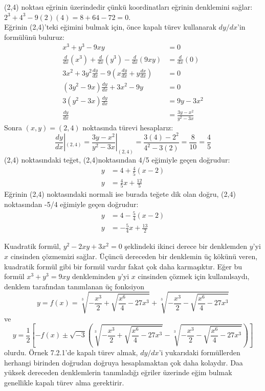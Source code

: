 \begin{cozum} (2,4) noktası eğrinin üzerindedir çünkü koordinatları eğrinin denklemini sağlar:\\
$2^3+4^3-9(2)(4)=8+64-72=0$.\\
Eğrinin (2,4)'teki eğimini bulmak için, önce kapalı türev kullanarak $dy/dx$'in formülünü buluruz:
	\begin{equation*}
	\begin{split}
	x^3+y^3-9xy&=0\\
	\frac{d}{dx}(x^3)+\frac{d}{dx}(y^3)-\frac{d}{dx}(9xy)&=\frac{d}{dx}(0)\\
	3x^2+3y^2\frac{dy}{dx}-9\left(x \frac{dy}{dx}+y \frac{dx}{dx}\right)&=0\\
	(3y^2-9x)\frac{dy}{dx}+3x^2-9y&=0\\
	3(y^2-3x)\frac{dy}{dx}&=9y-3x^2\\
	\frac{dy}{dx}&=\frac{3y-x^2}{y^2-3x}
	\end{split}
	\end{equation*}
Sonra $(x,y)=(2,4)$ noktasında türevi hesaplarız:
	\begin{equation*}
	\frac{dy}{dx}|_{(2,4)}=\frac{3y-x^2}{y^2-3x}|_{(2,4)}=\frac{3(4)-2^2}{4^2-3(2)}=\frac{8}{10}=\frac{4}{5}
	\end{equation*}
(2,4) noktasındaki teğet, (2,4)noktasından 4/5 eğimiyle geçen doğrudur:
	\begin{equation*}
	\begin{split}
	y&=4+\frac{4}{5}(x-2)\\
	y&=\frac{4}{5}x+\frac{12}{5}
	\end{split}
	\end{equation*}
Eğrinin (2,4) noktasındaki normali ise burada teğete dik olan doğru, (2,4) noktasından -5/4 eğimiyle geçen doğrudur:
	\begin{equation*}
	\begin{split}
	y&=4-\frac{5}{4}(x-2)\\
	y&=-\frac{5}{4}x+\frac{13}{2}
	\end{split}
	\end{equation*}
\end{cozum}
Kuadratik formül, $y^2-2xy+3x^2=0$ şeklindeki ikinci derece bir denklemden $y$'yi $x$ cinsinden çözmemizi sağlar. Üçüncü dereceden bir denklemin üç kökünü veren, kuadratik formül gibi bir formül vardır fakat çok daha karmaşıktır. Eğer bu formül $x^3+y^3=9xy$ denkleminden $y$'yi $x$ cinsinden çözmek için kullanılsaydı, denklem tarafından tanımlanan üç fonksiyon
	\begin{equation*}
	y=f(x)=\sqrt[3] {-\frac{x^3}{2}+\sqrt{\frac{x^6}{4}-27x^3}}+\sqrt[3] {-\frac{x^3}{2}-\sqrt{\frac{x^6}{4}-27x^3}}
	\end{equation*}
ve
	\begin{equation*}
y=\frac{1}{2}\left[-f(x) \pm \sqrt{-3}\left(\sqrt[3] {-\frac{x^3}{2}+\sqrt{\frac{x^6}{4}-27x^3}}-\sqrt[3] {-\frac{x^3}{2}-\sqrt{\frac{x^6}{4}-27x^3}}\right)\right]
	\end{equation*}
olurdu. Örnek 7.2.1'de kapalı türev almak, $dy/dx$'i yukarıdaki formüllerden herhangi birinden doğrudan doğruya hesaplamaktan çok daha kolaydır. Daa yüksek dereceden denklemlerin tanımladığı eğriler üzerinde eğim bulmak genellikle kapalı türev alma gerektirir.

